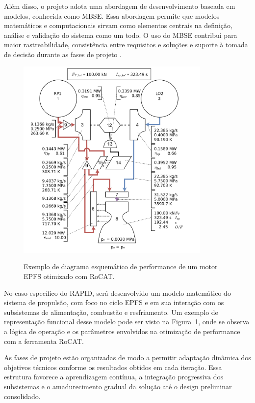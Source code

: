 Além disso, o projeto adota uma abordagem de desenvolvimento baseada em modelos, conhecida como \Gls{MBSE}. Essa abordagem permite que modelos matemáticos e computacionais sirvam como elementos centrais na definição, análise e validação do sistema como um todo. O uso do \Gls{MBSE} contribui para maior rastreabilidade, consistência entre requisitos e soluções e suporte à tomada de decisão durante as fases de projeto \cite{EstefanMBSE2008}.

\begin{figure}[h!]
    \centering
    \caption{Exemplo de diagrama esquemático de performance de um motor \gls{EPFS} otimizado com \gls{RoCAT}.}
    \includegraphics[width=0.85\textwidth]{Imagens/EPFS.png}
    \label{fig:EPFS}
\end{figure}

No caso específico do \Gls{RAPID}, será desenvolvido um modelo matemático do sistema de propulsão, com foco no ciclo \gls{EPFS} e em sua interação com os subsistemas de alimentação, combustão e resfriamento. Um exemplo de representação funcional desse modelo pode ser visto na Figura~\ref{fig:EPFS}, onde se observa a lógica de operação e os parâmetros envolvidos na otimização de performance com a ferramenta \gls{RoCAT}.

As fases de projeto estão organizadas de modo a permitir adaptação dinâmica dos objetivos técnicos conforme os resultados obtidos em cada iteração. Essa estrutura favorece a aprendizagem contínua, a integração progressiva dos subsistemas e o amadurecimento gradual da solução até o design preliminar consolidado.

